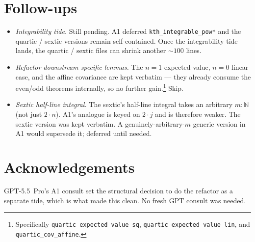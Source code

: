 \documentclass[11pt]{article}
\begin{document}
\section{Follow-ups}

\begin{itemize}[leftmargin=1.5em]
\item \emph{Integrability tide.} Still pending. A1 deferred
  \texttt{kth\_integrable\_pow*} and the quartic / sextic versions
  remain self-contained. Once the integrability tide lands, the
  quartic / sextic files can shrink another ${\sim}100$ lines.
\item \emph{Refactor downstream specific lemmas.} The $n = 1$
  expected-value, $n = 0$ linear case, and the affine covariance are
  kept verbatim --- they already consume the even/odd theorems
  internally, so no further gain.\footnote{Specifically
  \texttt{quartic\_expected\_value\_sq},
  \texttt{quartic\_expected\_value\_lin}, and
  \texttt{quartic\_cov\_affine}.} Skip.
\item \emph{Sextic half-line integral.} The sextic's half-line
  integral takes an arbitrary $m : \mathbb N$ (not just $2 \cdot n$).
  A1's analogue is
  keyed on $2 \cdot j$ and is therefore weaker. The sextic version
  was kept verbatim. A genuinely-arbitrary-$m$ generic version in A1
  would supersede it; deferred until needed.
\end{itemize}

\section*{Acknowledgements}

GPT-5.5~Pro's A1 consult set the structural decision to do the
refactor as a separate tide, which is what made this clean. No
fresh GPT consult was needed.
\end{document}
